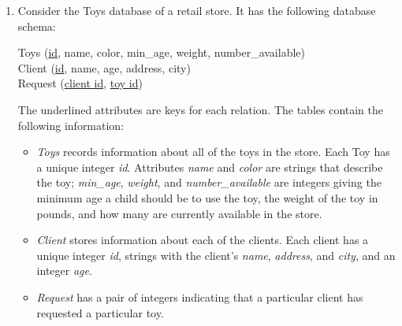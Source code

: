 \documentclass[12pt]{article}
\newcommand{\yr}[1]{\hfill\textcolor{gray}{\small\textbf{[#1]}}}
\newcommand{\mk}[1]{\textcolor{orange!70!black}{\small\textbf{(#1 marks)}}}
\begin{document}
\begin{enumerate}
 Using the schema created for the restaurant database in:
\begin{enumerate}
  \item Write a SQL query to create a view that contains the total cost of production of each food item. Cost of production for simple items depends on the total cost of ingredients (unit cost $\times$ quantity used); for packages, it depends on the total cost of the containing simple items.
  \item Using the schema and view above, find the monthly profit for each food item where profit $=$ (marketed price $-$ cost of production) $\times$ quantity sold in the month.
\end{enumerate}
\mk{20} \yr{CSE 215 | L-2/T-1 | 2022--23}


\item Consider the Toys database of a retail store. It has the following database schema:

\vspace{0.2cm}
\noindent Toys (\underline{id}, name, color, min\_age, weight, number\_available) \\
Client (\underline{id}, name, age, address, city) \\
Request (\underline{client id}, \underline{toy id})

\vspace{0.2cm}
\noindent The underlined attributes are keys for each relation. The tables contain the following information:

\begin{itemize}
    \item \textit{Toys} records information about all of the toys in the store. Each Toy has a unique integer \textit{id}. Attributes \textit{name} and \textit{color} are strings that describe the toy; \textit{min\_age}, \textit{weight}, and \textit{number\_available} are integers giving the minimum age a child should be to use the toy, the weight of the toy in pounds, and how many are currently available in the store.
    
    \item \textit{Client} stores information about each of the clients. Each client has a unique integer \textit{id}, strings with the client's \textit{name}, \textit{address}, and \textit{city}, and an integer \textit{age}.
    
    \item \textit{Request} has a pair of integers indicating that a particular client has requested a particular toy.
\end{itemize}


\end{enumerate}
\end{document}
